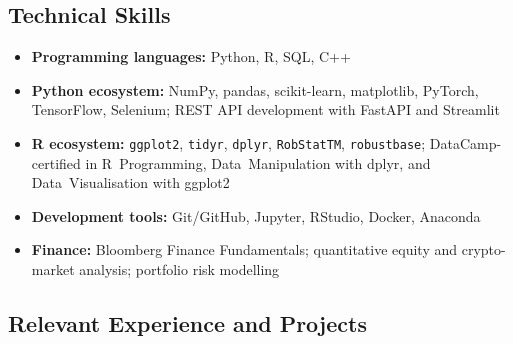 \documentclass[11pt, a4paper]{article}
\begin{document}
\subsection{Technical Skills}

\begin{itemize}[leftmargin=1.5em, itemsep=3pt]
  \item \textbf{Programming languages:} Python, R, SQL, C++
  \item \textbf{Python ecosystem:}
        NumPy, pandas, scikit-learn, matplotlib, PyTorch, TensorFlow,
        Selenium; REST API development with FastAPI and Streamlit
  \item \textbf{R ecosystem:}
        \texttt{ggplot2}, \texttt{tidyr}, \texttt{dplyr},
        \texttt{RobStatTM}, \texttt{robustbase};
        DataCamp-certified in R~Programming, Data~Manipulation with dplyr,
        and Data~Visualisation with ggplot2
  \item \textbf{Development tools:}
        Git/GitHub, Jupyter, RStudio, Docker, Anaconda
  \item \textbf{Finance:}
        Bloomberg Finance Fundamentals; quantitative equity and
        crypto-market analysis; portfolio risk modelling
\end{itemize}

\subsection{Relevant Experience and Projects}
\end{document}
